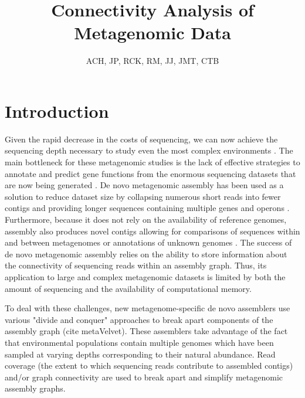 \documentclass[11pt]{article} %
\begin{document}
\title{Connectivity Analysis of Metagenomic Data}
\author{ACH, JP, RCK, RM, JJ, JMT, CTB}
\maketitle

\section{Introduction}
Given the rapid decrease in the costs of sequencing, we can now achieve the sequencing depth necessary to study even the most complex environments \cite{Hess:2011p686,Qin:2010p189}.  The main bottleneck for these metagenomic studies is the lack of effective strategies to annotate and predict gene functions from the enormous sequencing datasets that are now being generated \cite{Hoff:2009p913,Kunin:2008p16,Noguchi:2006p968,Zhang:2012p959}.  De novo metagenomic assembly has been used as a solution to reduce dataset size by collapsing numerous short reads into fewer contigs and providing longer sequences containing multiple genes and operons \cite{Miller:2010p226,Pop:2009p798}.  Furthermore, because it does not rely on the availability of reference genomes, assembly also produces novel contigs allowing for comparisons of sequences within and between metagenomes \cite{Li:2009p707,Schloss:2008p2} or annotations of unknown genomes \cite{Hess:2011p686}.  The success of de novo metagenomic assembly relies on the ability to store information about the connectivity of sequencing reads within an assembly graph.  Thus, its application to large and complex metagenomic datasets is limited by both the amount of sequencing and the availability of computational memory. 

To deal with these challenges, new metagenome-specific de novo assemblers use various "divide and conquer" approaches to break apart components of the assembly graph \cite{Peng:2011p898} (cite metaVelvet).  These assemblers take advantage of the fact that environmental populations contain multiple genomes which have been sampled at varying depths corresponding to their natural abundance.  Read coverage (the extent to which sequencing reads contribute to assembled contigs) and/or graph connectivity are used to break apart and simplify metagenomic assembly graphs. 
\end{document}
